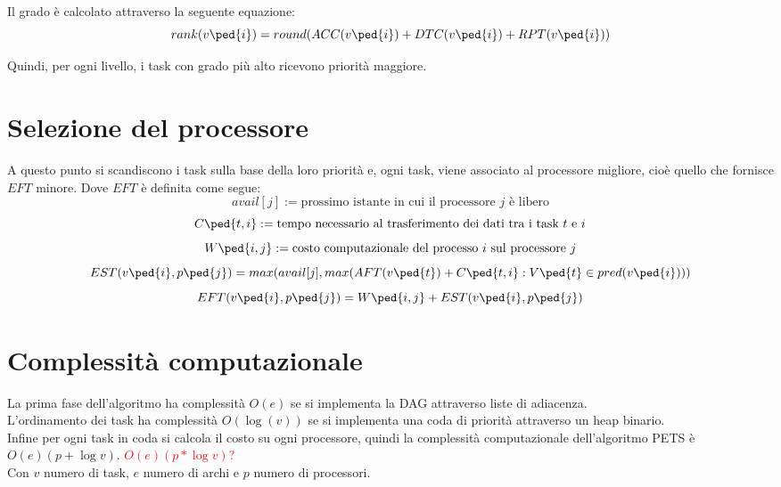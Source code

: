 Il grado è calcolato attraverso la seguente equazione:
\begin{equation}\label{Grado}
	rank(v\ped{i}) = round(ACC(v\ped{i}) + DTC(v\ped{i}) + RPT(v\ped{i}))
\end{equation}

Quindi, per ogni livello, i task con grado più alto ricevono priorità maggiore.



\section{Selezione del processore}
A questo punto si scandiscono i task sulla base della loro priorità e, ogni task, viene associato al processore migliore, cioè quello che fornisce $EFT$ minore. 
Dove $EFT$ è definita come segue:
\begin{displaymath}
	avail[j] := \text{prossimo istante in cui il processore $j$ è libero}
\end{displaymath}
\begin{displaymath}
	C\ped{t,i} := \text{tempo necessario al trasferimento dei dati tra i task $t$ e $i$} 
\end{displaymath}
\begin{displaymath}
	W\ped{i,j} := \text{costo computazionale del processo $i$ sul processore $j$} 
\end{displaymath}
\begin{equation}\label{EST}
	EST(v\ped{i},p\ped{j}) = max(avail[j], max(AFT(v\ped{t}) + C\ped{t,i} : V\ped{t} \in pred(v\ped{i})))
\end{equation}
\begin{equation}\label{EFT}
	EFT(v\ped{i},p\ped{j}) = W\ped{i,j} + EST(v\ped{i},p\ped{j})
\end{equation}


\section{Complessità computazionale}
La prima fase dell'algoritmo ha complessità $O(e)$ se si implementa la DAG attraverso liste di adiacenza.
\\
L'ordinamento dei task ha complessità $O(\log(v))$ se si implementa una coda di priorità attraverso un heap binario.
\\
Infine per ogni task in coda si calcola il costo su ogni processore, quindi la complessità computazionale dell'algoritmo PETS è \( O(e)(p + \log{v}) \). \textcolor{red}{\( O(e)(p * \log{v}) \)?}
\\
Con $v$ numero di task, $e$ numero di archi e $p$ numero di processori.